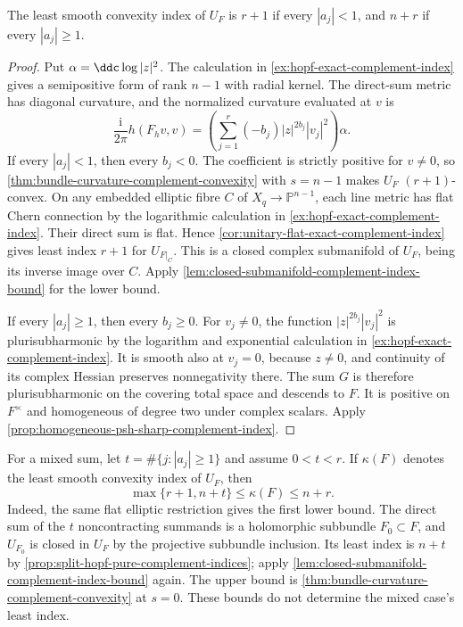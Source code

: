 \begin{proposition}\label{prop:split-hopf-pure-complement-indices}
The least smooth convexity index of $U_F$ is $r+1$ if every $|a_j|<1$, and $n+r$ if every $|a_j|\geq1$.
\end{proposition}
\begin{proof}
Put $\alpha=\ddc\log|z|^2$. The calculation in \cref{ex:hopf-exact-complement-index} gives a semipositive form of rank $n-1$ with radial kernel. The direct-sum metric has diagonal curvature, and the normalized curvature evaluated at $v$ is
\[
 \frac{\mathrm i}{2\pi}h(F_hv,v)
 =\left(\sum_{j=1}^r(-b_j)|z|^{2b_j}|v_j|^2\right)\alpha.
\]
If every $|a_j|<1$, then every $b_j<0$. The coefficient is strictly positive for $v\ne0$, so \cref{thm:bundle-curvature-complement-convexity} with $s=n-1$ makes $U_F$ $(r+1)$-convex. On any embedded elliptic fibre $C$ of $X_q\to\mathbb P^{n-1}$, each line metric has flat Chern connection by the logarithmic calculation in \cref{ex:hopf-exact-complement-index}. Their direct sum is flat. Hence \cref{cor:unitary-flat-exact-complement-index} gives least index $r+1$ for $U_{F|_C}$. This is a closed complex submanifold of $U_F$, being its inverse image over $C$. Apply \cref{lem:closed-submanifold-complement-index-bound} for the lower bound.

If every $|a_j|\geq1$, then every $b_j\geq0$. For $v_j\ne0$, the function $|z|^{2b_j}|v_j|^2$ is plurisubharmonic by the logarithm and exponential calculation in \cref{ex:hopf-exact-complement-index}. It is smooth also at $v_j=0$, because $z\ne0$, and continuity of its complex Hessian preserves nonnegativity there. The sum $G$ is therefore plurisubharmonic on the covering total space and descends to $F$. It is positive on $F^\times$ and homogeneous of degree two under complex scalars. Apply \cref{prop:homogeneous-psh-sharp-complement-index}.
\end{proof}

For a mixed sum, let $t=\#\{j:|a_j|\geq1\}$ and assume $0<t<r$. If $\kappa(F)$ denotes the least smooth convexity index of $U_F$, then
\[
 \max\{r+1,n+t\}\leq\kappa(F)\leq n+r.
\]
Indeed, the same flat elliptic restriction gives the first lower bound. The direct sum of the $t$ noncontracting summands is a holomorphic subbundle $F_0\subset F$, and $U_{F_0}$ is closed in $U_F$ by the projective subbundle inclusion. Its least index is $n+t$ by \cref{prop:split-hopf-pure-complement-indices}; apply \cref{lem:closed-submanifold-complement-index-bound} again. The upper bound is \cref{thm:bundle-curvature-complement-convexity} at $s=0$. These bounds do not determine the mixed case's least index.
